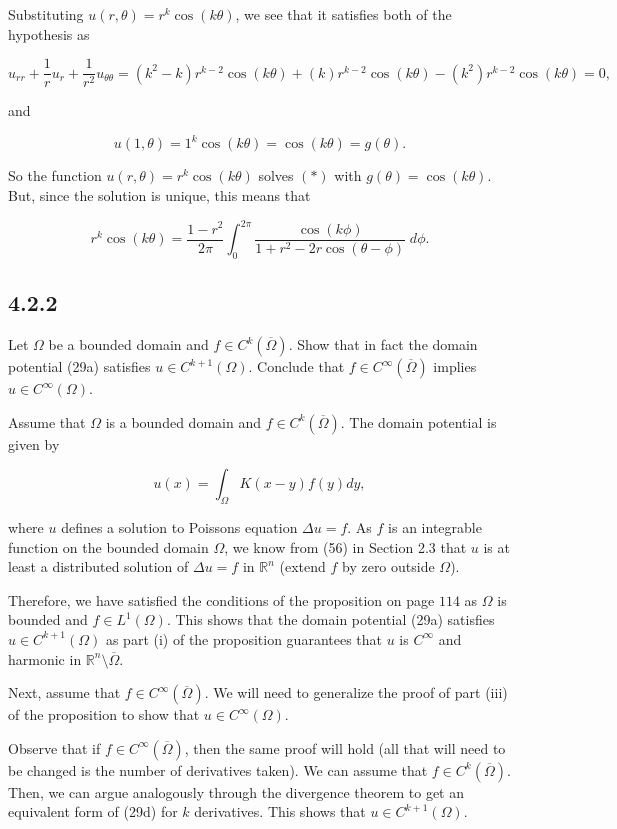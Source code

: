 \documentclass{article}
\begin{document}
Substituting $u(r,\theta) = r^k \cos(k\theta)$, we see that it satisfies both of the hypothesis as

$$u_{rr}+\frac{1}{r}u_r+\frac{1}{r^2}u_{\theta\theta}=(k^2-k)r^{k-2}\cos(k\theta)+(k)r^{k-2}\cos(k\theta)-(k^2)r^{k-2}\cos(k\theta)=0,$$

and

$$u(1,\theta)=1^k \cos(k\theta)=\cos(k\theta)=g(\theta).$$


So the function $u(r,\theta) = r^k\cos(k\theta)$ solves $(*)$ with $g(\theta) = \cos(k\theta)$. But, since the solution is unique, this means that

$$r^k\cos(k\theta) = \frac{1-r^2}{2\pi}\int_0^{2\pi}\frac{\cos(k\phi)}{1+r^2-2r\cos(\theta-\phi)}\;d\phi.$$

\subsection{\textbf{4.2.2}} Let $\Omega$ be a bounded domain and $f\in C^k(\overline{\Omega})$. Show that in fact the domain potential (29a) satisfies $u\in C^{k+1}(\Omega)$. Conclude that $f\in C^{\infty}(\overline{\Omega})$ implies $u\in C^{\infty}(\Omega)$.

Assume that $\Omega$ is a bounded domain and $f\in C^k(\overline{\Omega})$. The domain potential is given by

$$u(x)=\int_{\Omega}K(x-y)f(y)dy,$$

where $u$ defines a solution to Poisson\textsc{}s equation $\Delta u = f$. As $f$ is an integrable function on the bounded domain $\Omega$, we know from (56) in Section 2.3 that $u$ is at least a distributed solution of $\Delta u = f$ in $\mathbb R^n$ (extend $f$ by zero outside $\Omega$). 

Therefore, we have satisfied the conditions of the proposition on page $114$ as $\Omega$ is bounded and $f\in L^1(\Omega)$. This shows that the domain potential (29a) satisfies $u\in C^{k+1}(\Omega)$ as part (i) of the proposition guarantees that $u$ is $C^\infty$ and harmonic in $\mathbb R^n\setminus \overline{\Omega}$.

Next, assume that $f\in C^{\infty}(\overline{\Omega})$. We will need to generalize the proof of part (iii) of the  proposition to show that $u\in C^{\infty}(\Omega)$. 

Observe that if $f\in C^{\infty}(\overline{\Omega})$, then the same proof will hold (all that will need to be changed is the number of derivatives taken). We can assume that $f\in C^k(\overline{\Omega})$. Then, we can argue analogously through the divergence theorem to get an equivalent form of (29d) for $k$ derivatives. This shows that $u\in C^{k+1}(\Omega)$.
\end{document}
